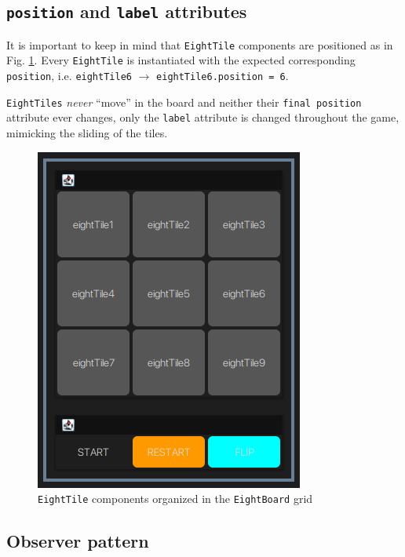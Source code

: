\subsection{\texttt{position} and \texttt{label} attributes}
\begin{paracol}{2}
   \colfill
   It is important to keep in mind that \lstinline|EightTile| components are positioned as in Fig. \ref{fig:netBeans_board}.
   Every \lstinline|EightTile| is instantiated with the expected corresponding \lstinline|position|, i.e. \lstinline|eightTile6| $ \rightarrow $ \lstinline|eightTile6.position = 6|.

   \lstinline|EightTiles| \textit{never} ``move'' in the board and neither their \lstinline|final position| attribute ever changes, only the \lstinline|label| attribute is changed throughout the game, mimicking the sliding of the tiles.

   \colfill
   
   
   \switchcolumn
   \begin{figure}[htbp]
      \centering
      \includegraphics[width=0.4\columnwidth]{images/netBeans_board.png}
      \caption{\lstinline|EightTile| components organized in the \lstinline|EightBoard| grid}
      \label{fig:netBeans_board}
   \end{figure}
\end{paracol}
\newpage
\subsection{Observer pattern}

